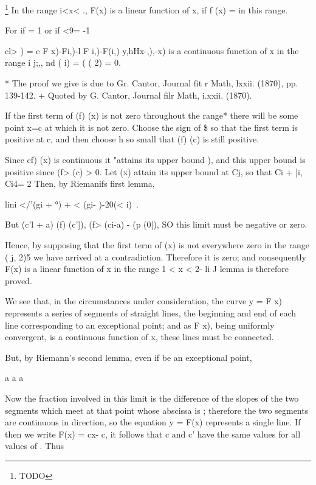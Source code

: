 {\footnote{TODO} In the range i<x< ., F(x) is a linear
function of x, if f (x) = in this range.

For if = 1 or if <9= -1

cl> ) = e F x)-Fi,)-l F i,)-F(i,) y,hHx-,),-x) is a continuous
function of x in the range i j;,, nd ( i) = ( ( 2) = 0.

* The proof we give is due to Gr. Cantor, Journal fit r Math, lxxii.
(1870), pp. 139-142. + Quoted by G. Cantor, Journal filr Math, i.xxii.
(1870).

%
%

If the first term of (f) (x) is not zero throughout the range* there
will be some point x=c at which it is not zero. Choose the sign of \$
so that the first term is positive at c, and then choose h so small
that (f) (c) is still positive.

Since cf) (x) is continuous it "attains its upper bound ), and
this upper bound is positive since (f> (c) > 0. Let (x) attain its
upper bound at Cj, so that Ci + |i, Ci4= 2  Then, by Riemanifs first
lemma,

lini </'(gi + °) + < (gi- )-20(< i)\ .

But (c'l + a) (f) (c']), (f> (ci-a) - (p (0|), SO this limit must be
negative or zero.

Hence, by supposing that the first term of (x) is not everywhere zero
in the range ( j, 2)5 we have arrived at a contradiction. Therefore it
is zero; and consequently F(x) is a linear function of x in the range
1 < x < 2- li J lemma is therefore proved.

We see that, in the circumstances under consideration, the curve y = F
x) represents a series of segments of straight lines, the beginning
and end of each line corresponding to an exceptional point; and as F
x), being uniformly convergent, is a continuous function of x, these
lines must be connected.

But, by Riemann's second lemma, even if be an exceptional point,

a a a

Now the fraction involved in this limit is the difference of the
slopes of the two segments which meet at that point whose abscissa is
; therefore the two segments are continuous in direction, so the
equation y = F(x) represents a single line. If then we write F(x) =
cx- c, it follows that c and c' have the same values for all values of
. Thus

}
